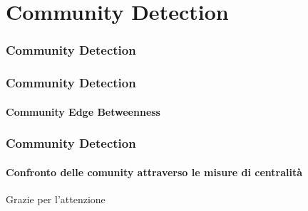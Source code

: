 \documentclass{beamer}
\begin{document}
\section{Community Detection}

\begin{frame}
\frametitle{Community Detection}

\end{frame}


\begin{frame}
\frametitle{Community Detection}
\framesubtitle{Community Edge Betweenness}

\end{frame}


\begin{frame}
\frametitle{Community Detection}
\framesubtitle{Confronto delle comunity attraverso le misure di centralità}

\end{frame}




\begin{frame}
\Huge{\centerline{Grazie per l'attenzione}}
\end{frame}
\end{document}
